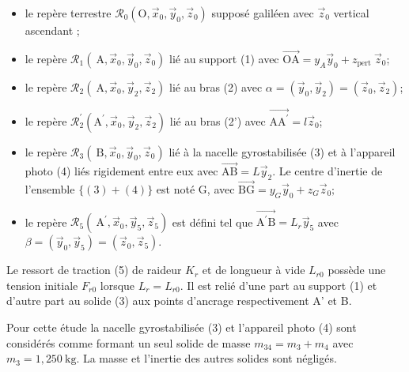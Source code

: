 \begin{itemize}
  \item le repère terrestre $\mathcal{R}_{0}\left(\mathrm{O}, \vec{x}_{0}, \vec{y}_{0}, \vec{z}_{0}\right)$ supposé galiléen avec $\vec{z}_{0}$ vertical ascendant ;

  \item le repère $\mathcal{R}_{1}\left(\mathrm{~A}, \vec{x}_{0}, \vec{y}_{0}, \vec{z}_{0}\right)$ lié au support (1) avec $\overrightarrow{\mathrm{OA}}=y_{A} \vec{y}_{0}+z_{\text {pert }} \vec{z}_{0}$;

  \item le repère $\mathcal{R}_{2}\left(\mathrm{~A}, \vec{x}_{0}, \vec{y}_{2}, \vec{z}_{2}\right)$ lié au bras (2) avec $\alpha=\left(\vec{y}_{0}, \vec{y}_{2}\right)=\left(\vec{z}_{0}, \vec{z}_{2}\right)$;

  \item le repère $\mathcal{R}_{2}^{\prime}\left(\mathrm{A}^{\prime}, \vec{x}_{0}, \vec{y}_{2}, \vec{z}_{2}\right)$ lié au bras (2') avec $\overrightarrow{\mathrm{AA}^{\prime}}=l \vec{z}_{0}$;

  \item le repère $\mathcal{R}_{3}\left(\mathrm{~B}, \vec{x}_{0}, \vec{y}_{0}, \vec{z}_{0}\right)$ lié à la nacelle gyrostabilisée (3) et à l'appareil photo (4) liés rigidement entre eux avec $\overrightarrow{\mathrm{AB}}=L \vec{y}_{2}$. Le centre d'inertie de l'ensemble $\{(3)+(4)\}$ est noté $\mathrm{G}$, avec $\overrightarrow{\mathrm{BG}}=y_{G} \vec{y}_{0}+z_{G} \vec{z}_{0} ;$

  \item le repère $\mathcal{R}_{5}\left(\mathrm{~A}^{\prime}, \vec{x}_{0}, \vec{y}_{5}, \vec{z}_{5}\right)$ est défini tel que $\overrightarrow{\mathrm{A}^{\prime} \mathrm{B}}=L_{r} \vec{y}_{5}$ avec $\beta=\left(\vec{y}_{0}, \vec{y}_{5}\right)=\left(\vec{z}_{0}, \vec{z}_{5}\right)$.

\end{itemize}




Le ressort de traction (5) de raideur $K_{r}$ et de longueur à vide $L_{r 0}$ possède une tension initiale $F_{r 0}$ lorsque $L_{r}=L_{r 0}$. Il est relié d'une part au support (1) et d'autre part au solide (3) aux points d'ancrage respectivement A' et B.

Pour cette étude la nacelle gyrostabilisée (3) et l'appareil photo (4) sont considérés comme formant un seul solide de masse $m_{34}=m_{3}+m_{4}$ avec $m_{3}=1,250 \mathrm{~kg}$. La masse et l'inertie des autres solides sont négligés.

